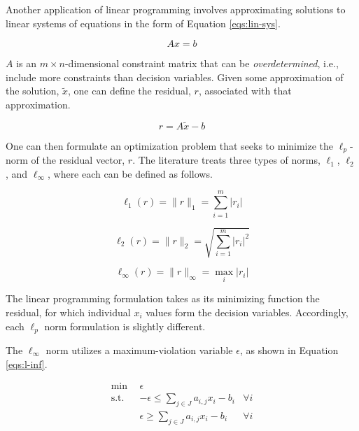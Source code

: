 Another application of linear programming involves approximating solutions to
linear systems of equations in the form of Equation \ref{eqs:lin-sys}.

\begin{equation}\label{eqs:lin-sys}
A x = b
\end{equation}

$A$ is an $m \times n$-dimensional constraint matrix that can
be \textit{overdetermined}, i.e., include more constraints than decision
variables. Given some approximation of the solution, $\tilde{x}$, one can define
the residual, $r$, associated with that approximation.

\begin{equation}\label{eqs:lin-sys}
r = A \tilde{x} - b
\end{equation}

One can then formulate an optimization problem that seeks to minimize the
$\ell_p$-norm of the residual vector, $r$. The literature treats three types of
norms, $\ell_1$, $\ell_2$, and $\ell_\infty$, where each can be defined as
follows.

\begin{equation}
\ell_1 (r) = \| r \|_1 = \sum_{i = 1}^{m} | r_i |
\end{equation}

\begin{equation}
\ell_2 (r) = \| r \|_2 = \sqrt{ \sum_{i = 1}^{m} | r_i |^2 }
\end{equation}

\begin{equation}
\ell_\infty (r) = \| r \|_\infty = \max_{i} | r_i |
\end{equation}

The linear programming formulation takes as its minimizing function the
residual, for which individual $x_i$ values form the decision
variables. Accordingly, each $\ell_p$ norm formulation is slightly
different. 

The $\ell_\infty$ norm utilizes a maximum-violation variable $\epsilon$, as shown
in Equation \ref{eqs:l-inf}.

\begin{subequations}\label{eqs:l-inf}
  \begin{align}
    \min \:\: & 
    \epsilon  \\
    \text{s.t.} \:\: &
    - \epsilon \leq \sum_{j \in J} a_{i,j} x_i - b_i
    & \forall i \\
    &
    \epsilon \geq \sum_{j \in J} a_{i,j} x_i - b_i
    & \forall i \\
  \end{align}
\end{subequations}

